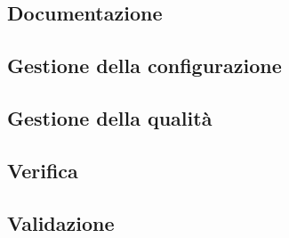 \documentclass[../norme-di-progetto.tex]{subfiles}
\begin{document}
\subsection{Documentazione}

\subsection{Gestione della configurazione}

\subsection{Gestione della qualità}

\subsection{Verifica}

\subsection{Validazione}
\end{document}
